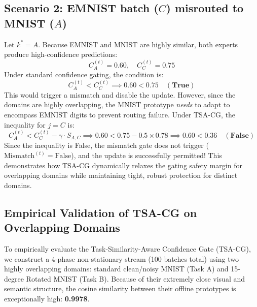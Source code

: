 \documentclass{article}
\theoremstyle{plain}
\theoremstyle{definition}
\theoremstyle{remark}
\begin{document}
\subsection{Scenario 2: EMNIST batch ($C$) misrouted to MNIST ($A$)}
Let $k^* = A$. Because EMNIST and MNIST are highly similar, both experts produce high-confidence predictions:
\begin{equation}
    C_A^{(t)} = 0.60, \quad C_C^{(t)} = 0.75
\end{equation}
Under standard confidence gating, the condition is:
\begin{equation}
    C_A^{(t)} < C_C^{(t)} \implies 0.60 < 0.75 \quad (\mathbf{True})
\end{equation}
This would trigger a mismatch and disable the update. However, since the domains are highly overlapping, the MNIST prototype \textit{needs} to adapt to encompass EMNIST digits to prevent routing failure.
Under TSA-CG, the inequality for $j = C$ is:
\begin{equation}
    C_A^{(t)} < C_C^{(t)} - \gamma \cdot S_{A,C} \implies 0.60 < 0.75 - 0.5 \times 0.78 \implies 0.60 < 0.36 \quad (\mathbf{False})
\end{equation}
Since the inequality is False, the mismatch gate does not trigger ($\text{Mismatch}^{(t)} = \text{False}$), and the update is successfully permitted! This demonstrates how TSA-CG dynamically relaxes the gating safety margin for overlapping domains while maintaining tight, robust protection for distinct domains.

\subsection{Empirical Validation of TSA-CG on Overlapping Domains}
To empirically evaluate the Task-Similarity-Aware Confidence Gate (TSA-CG), we construct a 4-phase non-stationary stream (100 batches total) using two highly overlapping domains: standard clean/noisy MNIST (Task A) and 15-degree Rotated MNIST (Task B). Because of their extremely close visual and semantic structure, the cosine similarity between their offline prototypes is exceptionally high: \textbf{0.9978}. 
\end{document}
